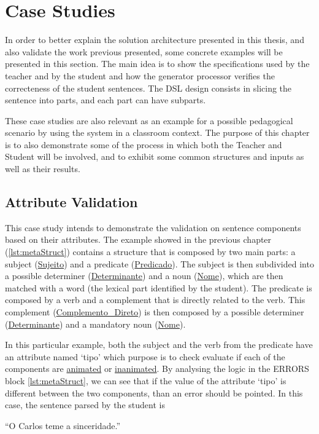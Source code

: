 \chapter{Case Studies} \label{case_study}
In order to better explain the solution architecture presented in this thesis, and also validate the work previous presented, 
some concrete examples will be presented in this section. 
The main idea is to show the specifications used by the teacher and by the student and how the generator processor verifies the correcteness of the student sentences. 
The DSL design consists in slicing the sentence into parts, and each part can have subparts.

These case studies are also relevant as an example for a possible pedagogical scenario by using the system in a classroom context.
The purpose of this chapter is to also demonstrate some of the process in which both the Teacher and Student will be involved, and to exhibit some common structures
and inputs as well as their results.

\section{Attribute Validation}
This case study intends to demonstrate the validation on sentence components based on their attributes. The example showed in the previous chapter 
(\autoref{lst:metaStruct}) contains a structure that is composed by two main parts: a subject (\underline{Sujeito}) and a predicate (\underline{Predicado}). 
The subject is then subdivided into a possible determiner (\underline{Determinante}) and a noun (\underline{Nome}), which are then matched with a word 
(the lexical part identified by the student). The predicate is composed by a verb and a complement that is directly related to the verb. This complement 
(\underline{Complemento\_Direto}) is then composed by a possible determiner (\underline{Determinante}) and a mandatory noun (\underline{Nome}).

In this particular example, both the subject and the verb from the predicate have an attribute named ‘tipo’ which purpose is to check evaluate if each of the components
are \underline{animated} or \underline{inanimated}. By analysing the logic in the ERRORS block \autoref{lst:metaStruct}, we can see that if the value of the attribute ‘tipo’ is different 
between the two components, than an error should be pointed. In this case, the sentence parsed by the student is

``O Carlos teme a sinceridade.''

